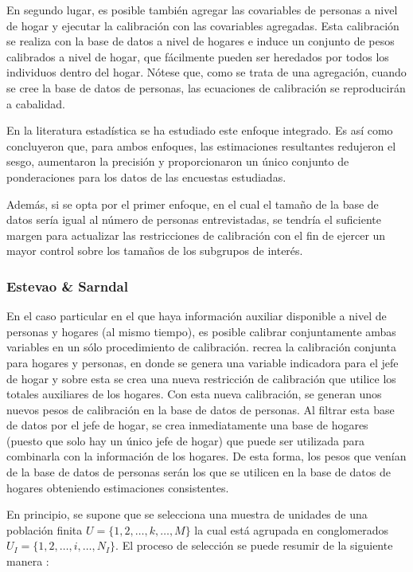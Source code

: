 \documentclass[
  10pt,
  spanish,
]{book}
\begin{document}
En segundo lugar, es posible también agregar las covariables de personas a nivel de hogar y ejecutar la calibración con las covariables agregadas. Esta calibración se realiza con la base de datos a nivel de hogares e induce un conjunto de pesos calibrados a nivel de hogar, que fácilmente pueden ser heredados por todos los individuos dentro del hogar. Nótese que, como se trata de una agregación, cuando se cree la base de datos de personas, las ecuaciones de calibración se reproducirán a cabalidad.

En la literatura estadística se ha estudiado este enfoque integrado. Es así como \citet{Neethling_Galpin_2006} concluyeron que, para ambos enfoques, las estimaciones resultantes redujeron el sesgo, aumentaron la precisión y proporcionaron un único conjunto de ponderaciones para los datos de las encuestas estudiadas.

Además, si se opta por el primer enfoque, en el cual el tamaño de la base de datos sería igual al número de personas entrevistadas, se tendría el suficiente margen para actualizar las restricciones de calibración con el fin de ejercer un mayor control sobre los tamaños de los subgrupos de interés.

\hypertarget{estevao-sarndal}{%
\subsubsection*{Estevao \& Sarndal}\label{estevao-sarndal}}

En el caso particular en el que haya información auxiliar disponible a nivel de personas y hogares (al mismo tiempo), es posible calibrar conjuntamente ambas variables en un sólo procedimiento de calibración. \citet[sec.~5]{Estevao_Sarndal_2006} recrea la calibración conjunta para hogares y personas, en donde se genera una variable indicadora para el jefe de hogar y sobre esta se crea una nueva restricción de calibración que utilice los totales auxiliares de los hogares. Con esta nueva calibración, se generan unos nuevos pesos de calibración en la base de datos de personas. Al filtrar esta base de datos por el jefe de hogar, se crea inmediatamente una base de hogares (puesto que solo hay un único jefe de hogar) que puede ser utilizada para combinarla con la información de los hogares. De esta forma, los pesos que venían de la base de datos de personas serán los que se utilicen en la base de datos de hogares obteniendo estimaciones consistentes.

En principio, se supone que se selecciona una muestra de unidades de una población finita \(U = \lbrace 1,2,\ldots,k,\ldots,M\rbrace\) la cual está agrupada en conglomerados \(U_I = \lbrace 1, 2,\ldots, i, \ldots, N_I \rbrace\). El proceso de selección se puede resumir de la siguiente manera \citep{Gutierrez_2016}:
\end{document}
